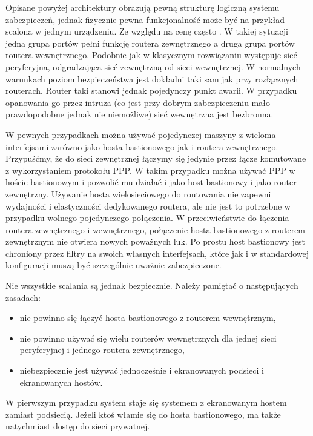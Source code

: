Opisane powyżej architektury obrazują pewną strukturę logiczną systemu
zabezpieczeń, jednak fizycznie pewna funkcjonalność może być na przykład
scalona w jednym urządzeniu. Ze względu na cenę często  . W takiej sytuacji jedna grupa portów pełni
funkcję routera zewnętrznego a druga grupa portów routera wewnętrznego.
Podobnie jak w klasycznym rozwiązaniu występuje sieć peryferyjna,
odgradzająca sieć zewnętrzną od sieci wewnętrznej. W normalnych warunkach
poziom bezpieczeństwa jest dokładni taki sam jak przy rozłącznych routerach.
Router taki stanowi jednak pojedynczy punkt awarii. W przypadku opanowania
go przez intruza (co jest przy dobrym zabezpieczeniu mało prawdopodobne
jednak nie niemożliwe) sieć wewnętrzna jest bezbronna.

W pewnych przypadkach można używać pojedynczej maszyny z wieloma
interfejsami zarówno jako hosta bastionowego jak i routera zewnętrznego.
Przypuśćmy, że do sieci zewnętrznej łączymy się jedynie przez łącze
komutowane z wykorzystaniem protokołu PPP. W takim przypadku można używać
PPP w hoście bastionowym i pozwolić mu działać i jako host bastionowy i jako
router zewnętrzny. Używanie hosta wielosieciowego do routowania nie zapewni
wydajności i elastyczności dedykowanego routera, ale nie jest to potrzebne w
przypadku wolnego pojedynczego połączenia. W przeciwieństwie do łączenia
routera zewnętrznego i wewnętrznego, połączenie hosta bastionowego z
routerem zewnętrznym nie otwiera nowych poważnych luk. Po prostu host
bastionowy jest chroniony przez filtry na swoich własnych interfejsach,
które jak i w standardowej konfiguracji muszą być szczególnie uważnie
zabezpieczone.

Nie wszystkie scalania są jednak bezpiecznie. Należy pamiętać o
następujących zasadach:

\begin{itemize}

\item nie powinno się łączyć hosta bastionowego z routerem wewnętrznym,

\item nie powinno używać się wielu routerów wewnętrznych dla jednej sieci
peryferyjnej i jednego routera zewnętrznego,

\item niebezpiecznie jest używać jednocześnie i ekranowanych podsieci i
ekranowanych hostów.

\end{itemize}

W pierwszym przypadku system staje się systemem z ekranowanym hostem zamiast
podsiecią. Jeżeli ktoś włamie się do hosta bastionowego, ma także
natychmiast dostęp do sieci prywatnej.

